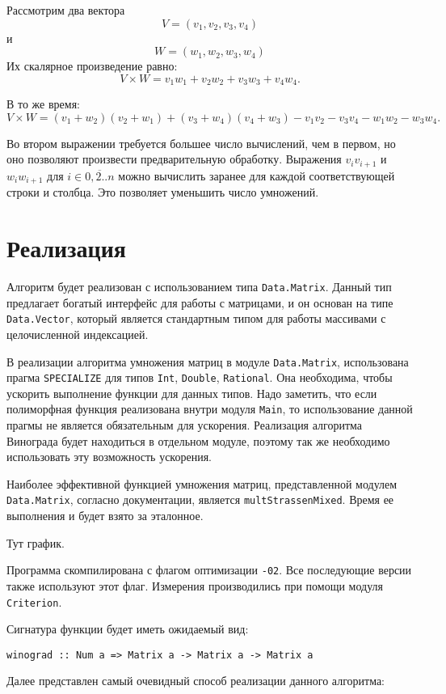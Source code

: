 \documentclass[a4paper,12pt,russian]{article}
\begin{document}
	Рассмотрим два вектора \[V = (v_1, v_2, v_3, v_4) \] и \[W = (w_1, w_2, w_3, w_4)\] Их скалярное произведение равно: \[V \times W = v_1w_1 + v_2w_2 + v_3w_3 + v_4w_4.\]
	
	В то же время: \[V \times W = (v_1 + w_2)(v_2 + w_1) + (v_3 + w_4)(v_4 + w_3) - v_1v_2 - v_3v_4 - w_1w_2 - w_3w_4.\]

	Во втором выражении требуется большее число вычислений, чем в первом, но оно позволяют произвести предварительную обработку. Выражения \(v_iv_{i+1}\) и \(w_iw_{i+1}\) для \(i\in\overline{0,2..n}\) можно вычислить заранее для каждой соответствующей строки и столбца. Это позволяет уменьшить число умножений.
	
	\section{Реализация}
	Алгоритм будет реализован с использованием типа \texttt{Data.Matrix}. Данный тип предлагает богатый интерфейс для работы с матрицами, и он основан на типе \texttt{Data.Vector}, который является стандартным типом для работы массивами с целочисленной индексацией.
	
	В реализации алгоритма умножения матриц в модуле \texttt{Data.Matrix}, использована прагма \texttt{SPECIALIZE} для типов \texttt{Int}, \texttt{Double}, \texttt{Rational}. Она необходима, чтобы ускорить выполнение функции для данных типов. Надо заметить, что если полиморфная функция реализована внутри модуля \texttt{Main}, то использование данной прагмы не является обязательным для ускорения. Реализация алгоритма Винограда будет находиться в отдельном модуле, поэтому так же необходимо использовать эту возможность ускорения.
	
	Наиболее эффективной функцией умножения матриц, представленной модулем \texttt{Data.Matrix}, согласно документации, является \texttt{multStrassenMixed}. Время ее выполнения и будет взято за эталонное.
	
	Тут график.
	
	Программа скомпилирована с флагом оптимизации \texttt{-02}. Все последующие версии также используют этот флаг. Измерения производились при помощи модуля \texttt{Criterion}.
	
	Сигнатура функции будет иметь ожидаемый вид:
	
	\begin{lstlisting} 
winograd :: Num a => Matrix a -> Matrix a -> Matrix a
	\end{lstlisting}
	
	Далее представлен самый очевидный способ реализации данного алгоритма:
	
\end{document}
